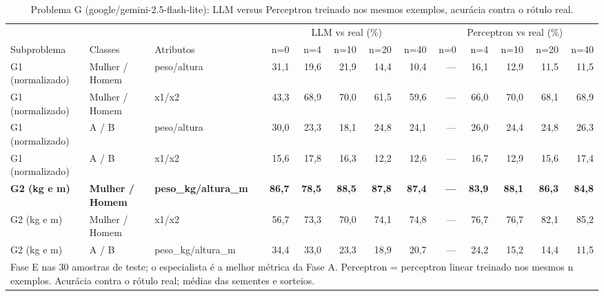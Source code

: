 \begin{table}[htbp]
\centering
\footnotesize
\caption{Problema G (google/gemini-2.5-flash-lite): LLM versus Perceptron treinado nos mesmos exemplos, acurácia contra o rótulo real.}
\label{tab:bloco3_G_faseE_LLM_vs_perceptron_flashlite}
\begin{tabular}{lllrrrrrrrrrr}
\toprule
 &  &  & \multicolumn{5}{c}{LLM vs real (\%)} & \multicolumn{5}{c}{Perceptron vs real (\%)} \\ \cmidrule(lr){4-8} \cmidrule(lr){9-13}
Subproblema & Classes & Atributos & n=0 & n=4 & n=10 & n=20 & n=40 & n=0 & n=4 & n=10 & n=20 & n=40 \\
\midrule
G1 (normalizado) & Mulher / Homem & peso/altura & 31,1 & 19,6 & 21,9 & 14,4 & 10,4 & — & 16,1 & 12,9 & 11,5 & 11,5 \\
G1 (normalizado) & Mulher / Homem & x1/x2 & 43,3 & 68,9 & 70,0 & 61,5 & 59,6 & — & 66,0 & 70,0 & 68,1 & 68,9 \\
G1 (normalizado) & A / B & peso/altura & 30,0 & 23,3 & 18,1 & 24,8 & 24,1 & — & 26,0 & 24,4 & 24,8 & 26,3 \\
G1 (normalizado) & A / B & x1/x2 & 15,6 & 17,8 & 16,3 & 12,2 & 12,6 & — & 16,7 & 12,9 & 15,6 & 17,4 \\
\textbf{G2 (kg e m)} & \textbf{Mulher / Homem} & \textbf{peso\_kg/altura\_m} & \textbf{86,7} & \textbf{78,5} & \textbf{88,5} & \textbf{87,8} & \textbf{87,4} & \textbf{—} & \textbf{83,9} & \textbf{88,1} & \textbf{86,3} & \textbf{84,8} \\
G2 (kg e m) & Mulher / Homem & x1/x2 & 56,7 & 73,3 & 70,0 & 74,1 & 74,8 & — & 76,7 & 76,7 & 82,1 & 85,2 \\
G2 (kg e m) & A / B & peso\_kg/altura\_m & 34,4 & 33,0 & 23,3 & 18,9 & 20,7 & — & 24,2 & 15,2 & 14,4 & 11,5 \\
\bottomrule
\multicolumn{13}{p{0.95\linewidth}}{\footnotesize Fase E nas 30 amostras de teste; o especialista é a melhor métrica da Fase A. Perceptron = perceptron linear treinado nos mesmos n exemplos. Acurácia contra o rótulo real; médias das sementes e sorteios.} \\
\end{tabular}
\end{table}
